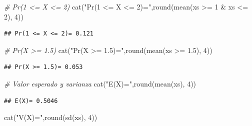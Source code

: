 \documentclass[
]{book}
\newenvironment{Shaded}{\begin{snugshade}}{\end{snugshade}}
\newcommand{\CommentTok}[1]{\textcolor[rgb]{0.56,0.35,0.01}{\textit{#1}}}
\newcommand{\DecValTok}[1]{\textcolor[rgb]{0.00,0.00,0.81}{#1}}
\newcommand{\FloatTok}[1]{\textcolor[rgb]{0.00,0.00,0.81}{#1}}
\newcommand{\FunctionTok}[1]{\textcolor[rgb]{0.00,0.00,0.00}{#1}}
\newcommand{\NormalTok}[1]{#1}
\newcommand{\SpecialCharTok}[1]{\textcolor[rgb]{0.00,0.00,0.00}{#1}}
\newcommand{\StringTok}[1]{\textcolor[rgb]{0.31,0.60,0.02}{#1}}
\theoremstyle{definition}
\theoremstyle{definition}
\theoremstyle{definition}
\theoremstyle{definition}
\theoremstyle{remark}
\begin{document}
\begin{Shaded}
\begin{Highlighting}[]
\CommentTok{\# Pr(1 \textless{}= X \textless{}= 2)}
\FunctionTok{cat}\NormalTok{(}\StringTok{"Pr(1 \textless{}= X \textless{}= 2)="}\NormalTok{,}\FunctionTok{round}\NormalTok{(}\FunctionTok{mean}\NormalTok{(xs }\SpecialCharTok{\textgreater{}=} \DecValTok{1} \SpecialCharTok{\&}\NormalTok{ xs }\SpecialCharTok{\textless{}=} \DecValTok{2}\NormalTok{), }\DecValTok{4}\NormalTok{))}
\end{Highlighting}
\end{Shaded}

\begin{verbatim}
## Pr(1 <= X <= 2)= 0.121
\end{verbatim}

\begin{Shaded}
\begin{Highlighting}[]
\CommentTok{\# Pr(X \textgreater{}= 1.5)}
\FunctionTok{cat}\NormalTok{(}\StringTok{"Pr(X \textgreater{}= 1.5)="}\NormalTok{,}\FunctionTok{round}\NormalTok{(}\FunctionTok{mean}\NormalTok{(xs }\SpecialCharTok{\textgreater{}=} \FloatTok{1.5}\NormalTok{), }\DecValTok{4}\NormalTok{))}
\end{Highlighting}
\end{Shaded}

\begin{verbatim}
## Pr(X >= 1.5)= 0.053
\end{verbatim}

\begin{Shaded}
\begin{Highlighting}[]
\CommentTok{\# Valor esperado y varianza}
\FunctionTok{cat}\NormalTok{(}\StringTok{"E(X)="}\NormalTok{,}\FunctionTok{round}\NormalTok{(}\FunctionTok{mean}\NormalTok{(xs), }\DecValTok{4}\NormalTok{))}
\end{Highlighting}
\end{Shaded}

\begin{verbatim}
## E(X)= 0.5046
\end{verbatim}

\begin{Shaded}
\begin{Highlighting}[]
\FunctionTok{cat}\NormalTok{(}\StringTok{"V(X)="}\NormalTok{,}\FunctionTok{round}\NormalTok{(}\FunctionTok{sd}\NormalTok{(xs), }\DecValTok{4}\NormalTok{))}
\end{Highlighting}
\end{Shaded}
\end{document}
